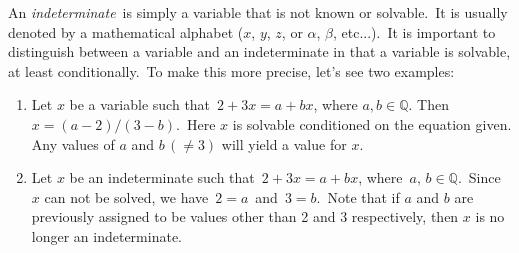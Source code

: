 \documentclass[12pt]{article}
\begin{document}

An {\em indeterminate}\, is simply a variable that is not known or solvable. \,It is usually denoted by a mathematical alphabet ($x$, $y$, $z$, or $\alpha$, $\beta$, etc...). \,It is important to distinguish between a variable and an indeterminate in that a variable is solvable, at least conditionally. \,To make this more precise, let's see two examples:

\begin{enumerate}
\item Let $x$ be a variable such that \,$2+3x=a+bx$, where $a,b\in\mathbb{Q}$.  Then \,$x=(a-2)/(3-b)$. \,Here $x$ is solvable conditioned on the equation given.  Any values of $a$ and $b\,(\neq 3)$ will yield a value for $x$.
\item Let $x$ be an indeterminate such that \,$2+3x=a+bx$, where \,$a,\,b\in\mathbb{Q}$. \,Since $x$ can not be solved, we have \,$2=a$\, and \,$3=b$. \,Note that if $a$ and $b$ are previously assigned to be values other than 2 and 3 respectively, then $x$ is no longer an indeterminate.
\end{enumerate}
\end{document}
